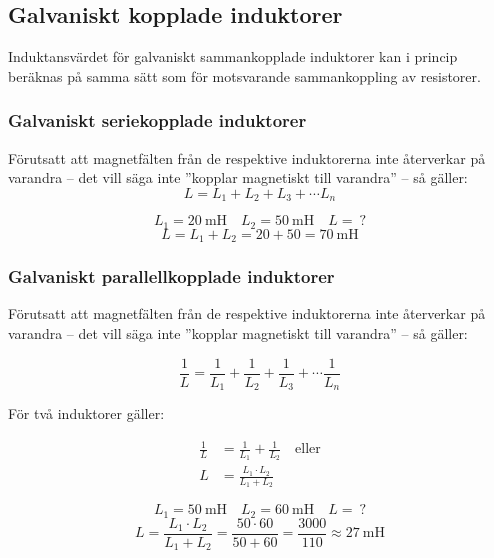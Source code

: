 \subsection{Galvaniskt kopplade induktorer}
\label{galvaniskt_kopplade_induktorer}

Induktansvärdet för galvaniskt sammankopplade induktorer kan i princip
beräknas på samma sätt som för motsvarande sammankoppling av resistorer.

\subsubsection{Galvaniskt seriekopplade induktorer}

Förutsatt att magnetfälten från de respektive induktorerna inte återverkar på
varandra -- det vill säga inte ''kopplar magnetiskt till varandra'' -- så
gäller:
%
\[L = L_1 + L_2 + L_3 + \cdots L_n\]
%
\newpage
\begin{exempelbox}
\noindent
\[ L_1 = \qty{20}{\milli\henry} \quad L_2 = \qty{50}{\milli\henry} \quad L =\ ? \]
\tcblower
\noindent
\[ L = L_1 + L_2 = 20 + 50 = \qty{70}{\milli\henry} \]
\end{exempelbox}

\subsubsection{Galvaniskt parallellkopplade induktorer}

Förutsatt att magnetfälten från de respektive induktorerna inte återverkar på
varandra -- det vill säga inte ''kopplar magnetiskt till varandra'' -- så
gäller:

\[
\frac{1}{L} = \frac{1}{L_1} + \frac{1}{L_2} + \frac{1}{L_3} +
\cdots \frac{1}{L_n}
\]

För två induktorer gäller:

\begin{align*}
  \frac{1}{L} &= \frac{1}{L_1} + \frac{1}{L_2} \quad \text{eller} \\
  L &= \frac{L_1 \cdot L_2}{L_1 + L_2}
\end{align*}

\begin{exempelbox}
\noindent
\[L_1 = \qty{50}{\milli\henry} \quad L_2 = \qty{60}{\milli\henry} \quad L =\ ?\]
\tcblower
\noindent
\[
  L = \frac{L_1 \cdot L_2}{L_1 + L_2}
  = \frac{50 \cdot 60}{50 + 60}
  = \frac{3000}{110}
  \approx \qty{27}{\milli\henry}
\]
\end{exempelbox}

